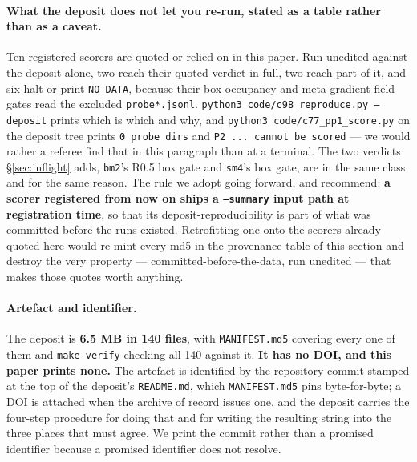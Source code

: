 \documentclass[10pt,letterpaper]{article}
\newcommand{\arm}[1]{\texttt{#1}}
\begin{document}
\paragraph{What the deposit does not let you re-run, stated as a table rather than as a caveat.}
Ten registered scorers are quoted or relied on in this paper. Run unedited against the deposit
alone, two reach their quoted verdict in full, two reach part of it, and six halt or print
\texttt{NO DATA}, because their box-occupancy and meta-gradient-field gates read the excluded
\texttt{probe*.jsonl}. \texttt{python3 code/c98\_reproduce.py --deposit} prints which is which and
why, and \texttt{python3 code/c77\_pp1\_score.py} on the deposit tree prints
\texttt{0 probe dirs} and \texttt{P2 ... cannot be scored} --- we would rather a referee find that
in this paragraph than at a terminal. The two verdicts \S\ref{sec:inflight} adds, \arm{bm2}'s R0.5
box gate and \arm{sm4}'s box gate, are in the same class and for the same reason. The rule we
adopt going forward, and recommend: \textbf{a scorer registered from now on ships a
\texttt{--summary} input path at registration time}, so that its deposit-reproducibility is part
of what was committed before the runs existed. Retrofitting one onto the scorers already quoted
here would re-mint every md5 in the provenance table of this section and destroy the very property
--- committed-before-the-data, run unedited --- that makes those quotes worth anything.

\paragraph{Artefact and identifier.}
The deposit is \textbf{6.5 MB in 140 files}, with \texttt{MANIFEST.md5} covering every one of them
and \texttt{make verify} checking all 140 against it. \textbf{It has no DOI, and this paper prints
none.} The artefact is identified by the repository commit stamped at the top of the deposit's
\texttt{README.md}, which \texttt{MANIFEST.md5} pins byte-for-byte; a DOI is attached when the
archive of record issues one, and the deposit carries the four-step procedure for doing that and
for writing the resulting string into the three places that must agree. We print the commit rather
than a promised identifier because a promised identifier does not resolve.
\end{document}

